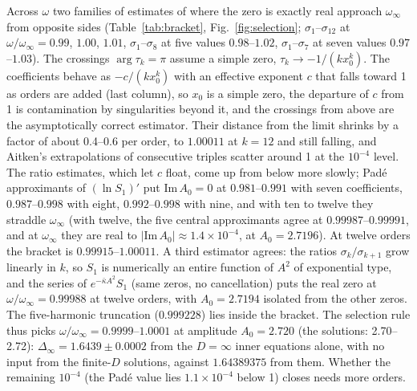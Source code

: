 \documentclass[aps,prd,onecolumn,superscriptaddress,nofootinbib,10pt]{revtex4-2}
\newcommand{\Dinf}{\Delta_\infty}
\begin{document}
Across $\omega$ two families of estimates of where the zero is exactly real approach $\omega_\infty$ from opposite sides
(Table~\ref{tab:bracket}, Fig.~\ref{fig:selection}; $\sigma_1$--$\sigma_{12}$ at $\omega/\omega_\infty = 0.99$, $1.00$, $1.01$, $\sigma_1$--$\sigma_8$ at five values
$0.98$--$1.02$, $\sigma_1$--$\sigma_7$ at seven values $0.97$--$1.03$). The crossings $\arg\tau_k = \pi$ assume a simple zero,
$\tau_k \to -1/(k x_0^k)$. The coefficients behave as $-c/(k x_0^k)$ with an effective exponent $c$ that falls toward 1 as
orders are added (last column), so $x_0$ is a simple zero, the departure of $c$ from 1 is contamination by singularities
beyond it, and the crossings from above are the asymptotically correct estimator. Their distance from the limit shrinks by a
factor of about 0.4--0.6 per order, to $1.00011$ at $k = 12$ and still falling, and Aitken's extrapolations of consecutive
triples scatter around 1 at the $10^{-4}$ level. The ratio estimates, which let $c$ float, come up from below more slowly; Pad\'e approximants
of $(\ln S_1)'$ put $\mathrm{Im}\,A_0 = 0$ at $0.981$--$0.991$ with seven coefficients, $0.987$--$0.998$ with eight, $0.992$--$0.998$ with
nine, and with ten to twelve they straddle $\omega_\infty$ (with twelve, the five central approximants agree at
$0.99987$--$0.99991$, and at $\omega_\infty$ they are real to $|\mathrm{Im}\,A_0| \approx 1.4\times10^{-4}$, at $A_0 = 2.7196$). At
twelve orders the bracket is $0.99915$--$1.00011$. A third estimator agrees: the ratios $\sigma_k/\sigma_{k+1}$ grow linearly
in $k$, so $S_1$ is numerically an entire function of $A^2$ of exponential type, and the series of $e^{-\bar\kappa A^2}S_1$ (same
zeros, no cancellation) puts the real zero at $\omega/\omega_\infty = 0.99988$ at twelve orders, with $A_0 = 2.7194$ isolated from
the other zeros. The five-harmonic truncation ($0.999228$) lies inside the bracket. The selection rule thus picks $\omega/\omega_\infty = 0.9999$--$1.0001$ at amplitude
$A_0 = 2.720$ (the solutions: 2.70--2.72): $\Dinf = 1.6439 \pm 0.0002$ from the $D = \infty$ inner equations alone, with no
input from the finite-$D$ solutions, against $1.64389375$ from them. Whether the remaining $10^{-4}$ (the Pad\'e value lies
$1.1\times10^{-4}$ below 1) closes needs more orders.
\end{document}
